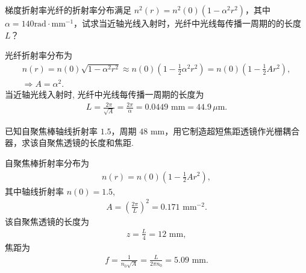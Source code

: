 \documentclass{assignment}
\begin{document}
\begin{prob}
    梯度折射率光纤的折射率分布满足 $n^2(r)=n^2(0)(1-\alpha^2r^2)$，其中 $\alpha=140\text{rad}\cdot\text{mm}^{-1}$，试求当近轴光线入射时，光纤中光线每传播一周期的的长度 $L$？
\end{prob}
\begin{sol}
    光纤折射率分布为
    \begin{gather}
        n(r)=n(0)\sqrt{1-\alpha^2r^2}\approx n(0)\left(1-\frac{1}{2}\alpha^2r^2\right)=n(0)\left(1-\frac{1}{2}Ar^2\right),\\
        \Longrightarrow A=\alpha^2.
    \end{gather}
    当近轴光线入射时, 光纤中光线每传播一周期的长度为
    \begin{align}
        L=\frac{2\pi}{\sqrt{A}}=\frac{2\pi}{\alpha}=0.0449\text{ mm}=44.9\,\mu\text{m}.
    \end{align}
\end{sol}

\begin{prob}
    已知自聚焦棒轴线折射率 $1.5$，周期 $48$ mm，用它制造超短焦距透镜作光栅耦合器，求该自聚焦透镜的长度和焦距.
\end{prob}
\begin{sol}
    自聚焦棒折射率分布为
    \begin{align}
        n(r)=n(0)\left(1-\frac{1}{2}Ar^2\right),
    \end{align}
    其中轴线折射率 $n(0)=1.5$,
    \begin{align}
        A=\left(\frac{2\pi}{L}\right)^2=0.171\text{ mm}^{-2}.
    \end{align}
    该自聚焦透镜的长度为
    \begin{align}
        z=\frac{L}{4}=12\text{ mm},
    \end{align}
    焦距为
    \begin{align}
        f=\frac{1}{n_0\sqrt{A}}=\frac{L}{2\pi n_0}=5.09\text{ mm}.
    \end{align}
\end{sol}
\end{document}
